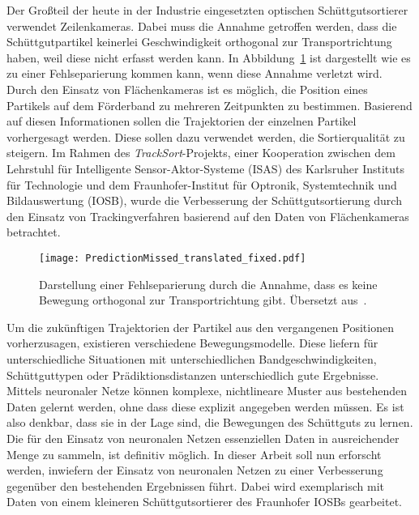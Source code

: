 
Der Großteil der heute in der Industrie eingesetzten optischen Schüttgutsortierer verwendet Zeilenkameras.
Dabei muss die Annahme getroffen werden, dass die Schüttgutpartikel keinerlei Geschwindigkeit orthogonal zur Transportrichtung haben,
weil diese nicht erfasst werden kann.
In Abbildung~\ref{fig:predMissed} ist dargestellt wie es zu einer Fehlseparierung kommen kann, wenn diese Annahme verletzt wird. \\
Durch den Einsatz von Flächenkameras ist es möglich, die Position eines Partikels auf dem Förderband zu mehreren Zeitpunkten zu bestimmen.
Basierend auf diesen Informationen sollen die Trajektorien der einzelnen Partikel vorhergesagt werden.
Diese sollen dazu verwendet werden, die Sortierqualität zu steigern. 
Im Rahmen des \textit{TrackSort}-Projekts, 
einer Kooperation zwischen dem Lehrstuhl für Intelligente Sensor-Aktor-Systeme (ISAS) des Karlsruher Instituts für Technologie
und dem Fraunhofer-Institut für Optronik, Systemtechnik und Bildauswertung (IOSB), 
wurde die Verbesserung der Schüttgutsortierung durch den Einsatz von Trackingverfahren basierend auf den Daten von Flächenkameras betrachtet.

\begin{figure}[h]
    \centering
    \texttt{[image: PredictionMissed\_translated\_fixed.pdf]}
    \caption[Darstellung einer Fehlseparierung basierend auf den Limitationen der Zeilenkamera. Übersetzt aus~~\cite{Pfaff2018}]
    {Darstellung einer Fehlseparierung durch die Annahme, dass es keine Bewegung orthogonal zur Transportrichtung gibt. 
    Übersetzt aus~\cite{Pfaff2018}.}
    \label{fig:predMissed}
\end{figure}


Um die zukünftigen Trajektorien der Partikel aus den vergangenen Positionen vorherzusagen, existieren verschiedene Bewegungsmodelle.
Diese liefern für unterschiedliche Situationen mit unterschiedlichen Bandgeschwindigkeiten, Schüttguttypen oder Prädiktionsdistanzen unterschiedlich gute Ergebnisse.  
Mittels neuronaler Netze können komplexe, nichtlineare Muster aus bestehenden Daten gelernt werden, ohne dass diese explizit angegeben werden müssen.
Es ist also denkbar, dass sie in der Lage sind, die Bewegungen des Schüttguts zu lernen.
Die für den Einsatz von neuronalen Netzen essenziellen Daten in ausreichender Menge zu sammeln, ist definitiv möglich. 
In dieser Arbeit soll nun erforscht werden, inwiefern der Einsatz von neuronalen Netzen zu einer Verbesserung gegenüber den bestehenden Ergebnissen führt.
Dabei wird exemplarisch mit Daten von einem kleineren Schüttgutsortierer des Fraunhofer IOSBs gearbeitet.

